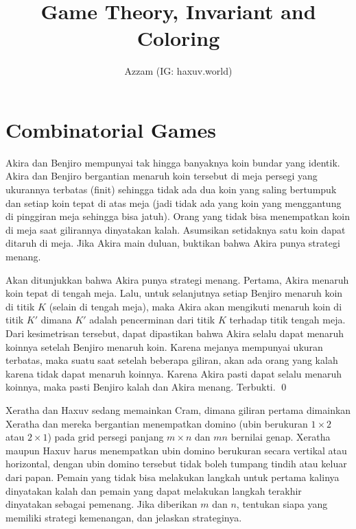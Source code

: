 \documentclass[12pt]{scrartcl}
\title{Game Theory, Invariant and Coloring}
\author{Azzam (IG: haxuv.world)}
\date{}
\begin{document}
\maketitle

\renewcommand*\contentsname{Daftar Isi}
\tableofcontents

\newpage

\section{Combinatorial Games}
\begin{soaljawab}
    Akira dan Benjiro mempunyai tak hingga banyaknya koin bundar yang identik. Akira dan Benjiro bergantian menaruh koin tersebut di meja persegi yang ukurannya terbatas (finit) sehingga tidak ada dua koin yang saling bertumpuk dan setiap koin tepat di atas meja (jadi tidak ada yang koin yang menggantung di pinggiran meja sehingga bisa jatuh). Orang yang tidak bisa menempatkan koin di meja saat gilirannya dinyatakan kalah. Asumsikan setidaknya satu koin dapat ditaruh di meja. Jika Akira main duluan, buktikan bahwa Akira punya strategi menang.

        \begin{solusi}
    Akan ditunjukkan bahwa Akira punya strategi menang. Pertama, Akira menaruh koin tepat di tengah meja. Lalu, untuk selanjutnya setiap Benjiro menaruh koin di titik $K$ (selain di tengah meja), maka Akira akan mengikuti menaruh koin di titik $K'$ dimana $K'$ adalah pencerminan dari titik $K$ terhadap titik tengah meja. Dari kesimetrisan tersebut, dapat dipastikan bahwa Akira selalu dapat menaruh koinnya setelah Benjiro menaruh koin. Karena mejanya mempunyai ukuran terbatas, maka suatu saat setelah beberapa giliran, akan ada orang yang kalah karena tidak dapat menaruh koinnya. Karena Akira pasti dapat selalu menaruh koinnya, maka pasti Benjiro kalah dan Akira menang. Terbukti. \qed
    \end{solusi}
\end{soaljawab}

\begin{soaljawab}
Xeratha dan Haxuv sedang memainkan Cram, dimana giliran pertama dimainkan Xeratha dan mereka bergantian menempatkan domino (ubin berukuran $1 \times 2$ atau $2 \times 1$) pada grid persegi panjang $m \times n$ dan $mn$ bernilai genap. Xeratha maupun Haxuv harus menempatkan ubin domino berukuran secara vertikal atau horizontal, dengan ubin domino tersebut tidak boleh tumpang tindih atau keluar dari papan. Pemain yang tidak bisa melakukan langkah untuk pertama kalinya dinyatakan kalah dan pemain yang dapat melakukan langkah terakhir dinyatakan sebagai pemenang. Jika diberikan $m$ dan $n$, tentukan siapa yang memiliki strategi kemenangan, dan jelaskan strateginya.
\end{soaljawab}
\end{document}
